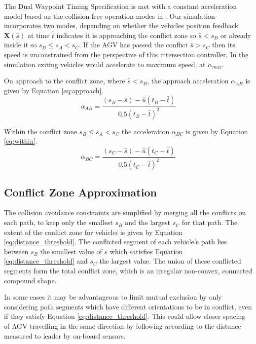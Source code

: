 The Dual Waypoint Timing Specification is met with a constant acceleration model based on the collision-free operation modes in \cite{He2020}. 
Our simulation incorporates two modes, depending on whether the vehicles position feedback $\bm{X}(\hat{s})$ at time $\hat{t}$ indicates it is approaching the conflict zone so $\hat{s}<s_B$ or already inside it so $s_B\leq s_A<s_C$. If the AGV has passed the conflict $\hat{s}>s_C$ then its speed is unconstrained from the perspective of this intersection controller. In the simulation exiting vehicles would accelerate to maximum speed, at $\alpha_{max}$.

On approach to the conflict zone, where $\hat{s}<s_B$, the approach acceleration $\alpha_{AB}$ is given by Equation \ref{eq:approach}.
\begin{equation}
\alpha_{AB} = \frac{(s_B - \hat{s}) - \hat{u}(t_B - \hat{t}) }{0.5 (t_B - \hat{t})^2}
\label{eq:approach}
\end{equation}

Within the conflict zone $s_B \leq s_A<s_C$ the acceleration $\alpha_{BC}$ is given by Equation \ref{eq:within}.
\begin{equation}
\alpha_{BC} = \frac{(s_C - \hat{s}) - \hat{u}(t_C - \hat{t}) }{0.5 (t_C - \hat{t})^2}
\label{eq:within}
\end{equation}

\subsection{Conflict Zone Approximation}
\label{sec:conflict_zone}
The collision avoidance constraints are simplified by merging all the conflicts on each path, to keep only the smallest $s_B$ and the largest $s_C$ for that path. The extent of the conflict zone for vehicle$i$ is given by Equation \ref{eq:distance_threshold}. The conflicted segment of each vehicle's path lies between $s_B$ the smallest value of $s$ which satisfies Equation \ref{eq:distance_threshold} and $s_C$ the largest value. The union of these conflicted segments form the total conflict zone, which is an irregular non-convex, connected compound shape. 

In some cases it may be advantageous to limit mutual exclusion by only considering path segments which have different orientations to be in conflict, even if they satisfy Equation \ref{eq:distance_threshold}. This could allow closer spacing of AGV travelling in the same direction by following according to the distance measured to leader by on-board sensors.

